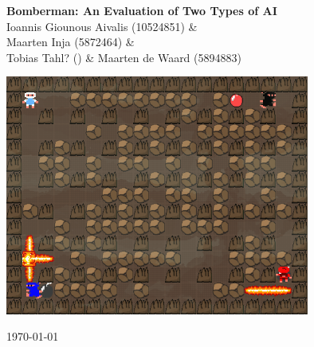 

\begin{center}
\Huge \textbf{Bomberman: An Evaluation of Two Types of AI}\\
\vspace*{0.8cm}
\Large Ioannis Giounous Aivalis (10524851) \& \\ Maarten Inja (5872464) \& \\ Tobias Tahl? () \& Maarten de Waard (5894883) 

\vspace*{4cm}

\includegraphics[width=10cm]{resources/bbman}

\vfill
\today

\end{center}
\thispagestyle{empty}
